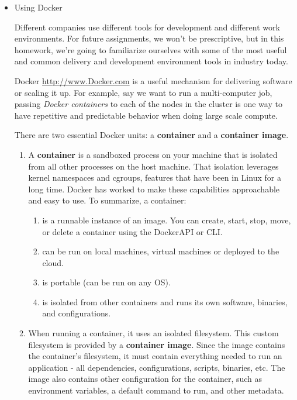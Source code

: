 \documentclass{cs6220-assignment}
\begin{document}
\maketitle

\begin{itemize}

\item Using Docker

Different companies use different tools for development and different work environments. For future assignments, we won't be prescriptive, but in this homework, we're going to familiarize ourselves with some of the most useful and common delivery and development environment tools in industry today.

Docker \url{http://www.Docker.com} is a  useful mechanism for delivering software or scaling it up. For example, say we want to run a multi-computer job, passing \emph{Docker containers} to each of the nodes in the cluster is one way to have repetitive and predictable behavior when doing large scale compute.

There are two essential Docker units: a \textbf{container} and a \textbf{container image}.

\begin{enumerate}
    \item A \textbf{container} is a sandboxed process on your machine that is isolated from all other processes on the host machine. That isolation leverages kernel namespaces and cgroups, features that have been in Linux for a long time. Docker has worked to make these capabilities approachable and easy to use. To summarize, a container:
    \begin{enumerate}
        \item is a runnable instance of an image. You can create, start, stop, move, or delete a container using the DockerAPI or CLI. 
        \item can be run on local machines, virtual machines or deployed to the cloud.
        \item is portable (can be run on any OS).
        \item is isolated from other containers and runs its own software, binaries, and configurations.
    \end{enumerate}

    \item When running a container, it uses an isolated filesystem. This custom filesystem is provided by a \textbf{container image}. Since the image contains the container’s filesystem, it must contain everything needed to run an application - all dependencies, configurations, scripts, binaries, etc. The image also contains other configuration for the container, such as environment variables, a default command to run, and other metadata.
\end{enumerate}


\end{itemize}
\end{document}
